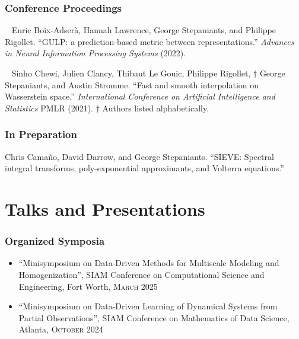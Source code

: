 \documentclass[a4paper,10pt]{article}
\newcommand{\faPaperclip}{{\ResumeLinkFont\symbol{"F0C6}}}
\begin{document}
\subsubsection*{Conference Proceedings}
\begin{enumerate}[label={[C\arabic*]}, leftmargin=*]
\item \href{\detokenize{https://arxiv.org/abs/2210.06545}}{\faPaperclip}~ Enric Boix-Adserà, Hannah Lawrence, George Stepaniants, and Philippe Rigollet. ``GULP: a prediction-based metric between representations.'' \textit{Advances in Neural Information Processing Systems} (2022).

\item \href{\detokenize{https://proceedings.mlr.press/v130/chewi21a}}{\faPaperclip}~ Sinho Chewi, Julien Clancy, Thibaut Le Gouic, Philippe Rigollet, $\dagger$ George Stepaniants, and Austin Stromme. ``Fast and smooth interpolation on Wasserstein space.'' \textit{International Conference on Artificial Intelligence and Statistics} PMLR (2021). $\dagger$ Authors listed alphabetically.
\end{enumerate}

\subsubsection*{In Preparation}
\begin{enumerate}[label={[P\arabic*]}, leftmargin=*]
\item Chris Camaño, David Darrow, and George Stepaniants. ``SIEVE: Spectral integral transforms, poly-exponential approximants, and Volterra equations.''
\end{enumerate}
\vspace{10pt}

\section{Talks and Presentations}
\subsubsection*{Organized Symposia}
\begin{itemize}
\item ``Minisymposium on Data-Driven Methods for Multiscale Modeling and Homogenization'', SIAM Conference on Computational Science and Engineering, Fort Worth, \textsc{March} 2025

\item ``Minisymposium on Data-Driven Learning of Dynamical Systems from Partial Observations'', SIAM Conference on Mathematics of Data Science, Atlanta, \textsc{October} 2024
\end{itemize}
\end{document}
